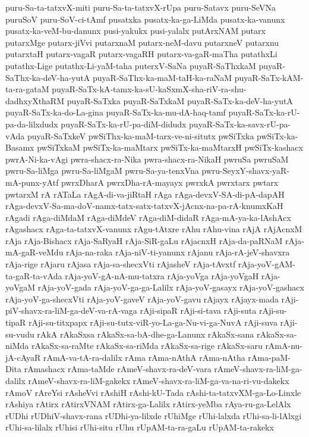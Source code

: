 {puru-Sa-ta-tatxvX-miti
puru-Sa-ta-tatxvX-rUpa
puru-Satavx
puru-SeVNa
puruSoV
puru-SoV-ci-tAmf
pusatxka
pusatx-ka-ga-LiMda
pusatx-ka-vanunx
pusatx-ka-veM-bu-danunx
pusi-yakukx
pusi-yalalx
putArxNAM
putarx
putarxMge
putarx-jiVvi
putarxnaM
putarx-neM-davu
putarxneV
putarxnu
putarxtaH
putarx-vagaR
putarx-vagaRH
putarx-va-gaR-maTha
putathxLi
putathx-Lige
putathx-Li-yaM-taha
puterxV-SaNa
puyaR-SaThxkaM
puyaR-SaThx-ka-deV-ha-yutA
puyaR-SaThx-ka-maM-taH-ka-raNaM
puyaR-SaTx-kAM-ta-ra-gataM
puyaR-SaTx-kA-tamx-ka-sU-kaSxmX-sha-riV-ra-shu-dadhxyXthaRM
puyaR-SaTxka
puyaR-SaTxkaM
puyaR-SaTx-ka-deV-ha-yutA
puyaR-SaTx-ka-do-La-gina
puyaR-SaTx-ka-mu-dA-haq-tamf
puyaR-SaTx-ka-rU-pa-da-lilxdudx
puyaR-SaTx-ka-rU-pa-diM-didudx
puyaR-SaTx-ka-savx-rU-pa-vAda
puyaR-SaTxkeV
pwSiThx-ka-maM-tarx-ve-ni-situtx
pwSiTxka
pwSiTx-ka-Basamx
pwSiTxkaM
pwSiTx-ka-maMtarx
pwSiTx-ka-maMtarxH
pwSiTx-kashacx
pwrA-Ni-ka-vAgi
pwra-shacx-ra-Nika
pwra-shacx-ra-NikaH
pwruSa
pwruSaM
pwru-Sa-liMga
pwru-Sa-liMgaM
pwru-Sa-ya-tenxVna
pwru-SeyxY-shavx-yaR-mA-punx-yAtf
pwrxDharA
pwrxDha-rA-mayayx
pwrxkA
pwrxtarx
pwtarx
pwtarxM
rA
rATaLa
rAgA-di-va-jiRtaH
rAga
rAga-devxV-SA-di-pA-dapAH
rAga-devxV-Sa-ma-doV-namx-tatx-satx-tatxvX-jAcnx-na-pa-rA-knumxKaH
rAgadi
rAga-diMdaM
rAga-diMdeV
rAga-diM-didaR
rAga-mA-ya-ka-lAshAcx
rAgashacx
rAga-ta-tatxvX-vanunx
rAgu-tAtxre
rAhu
rAhu-vina
rAjA
rAjAcnxM
rAja
rAja-Bishacx
rAja-SaRyaH
rAja-SiR-gaLu
rAjacnxH
rAja-da-paRNaM
rAja-mA-gaR-veMdu
rAja-na-raka
rAja-niV-ti-yanunx
rAjanu
rAja-rA-jeV-shavxra
rAja-rige
rAjaru
rAjasa
rAja-sa-shecxVti
rAjasheV
rAja-tAvxtf
rAja-yoV-gAM-ta-gaR-ta-vAda
rAja-yoV-gA-nA-mu-tatxra
rAja-yoVga
rAja-yoVgaH
rAja-yoVgaM
rAja-yoV-gada
rAja-yoV-ga-ga-Lalilx
rAja-yoV-gasayx
rAja-yoV-gashacx
rAja-yoV-ga-shecxVti
rAja-yoV-gaveV
rAja-yoV-gavu
rAjayx
rAjayx-mada
rAji-piV-shavx-ra-liM-ga-deV-va-rA-vaga
rAji-sipaR
rAji-si-tava
rAji-suta
rAji-su-tipaR
rAji-su-titxpapx
rAji-su-tutx-viR-yo-La-ga-Nu-vi-ga-NuvA
rAji-suva
rAji-su-vudu
rAkA
rAkaSxsa
rAkaSx-sa-bA-dhe-ga-Lanunx
rAkaSx-sana
rAkaSx-sa-niMda
rAkaSx-sa-raMte
rAkaSx-sa-riMda
rAkaSx-sa-rige
rAkaSx-saru
rAmA-nu-jA-cAyaR
rAmA-va-tA-ra-dalilx
rAma
rAma-nAthA
rAma-nAtha
rAma-paM-Dita
rAmashacx
rAma-taMde
rAmeV-shavx-ra-deV-vara
rAmeV-shavx-ra-liM-ga-dalilx
rAmeV-shavx-ra-liM-gakekx
rAmeV-shavx-ra-liM-ga-va-na-ri-vu-dakekx
rAmoV
rAreYsi
rAsheVvi
rAshiH
rAshi-kU-Tada
rAshi-ta-tatxvXM-ga-Lo-Linxle
rAshiya
rAtirx
rAtirxVNAM
rAtirx-ga-Lalilx
rAtirx-yeMba
rAya-ru-ga-LelAlx
rUDhi
rUDhiV-shavx-rana
rUDhi-ya-lilxde
rUhiMge
rUhi-lalxda
rUhi-sa-li-lAlxgi
rUhi-sa-lilalx
rUhisi
rUhi-situ
rUhu
rUpAM-ta-ra-gaLu
rUpAM-ta-rakekx
}
